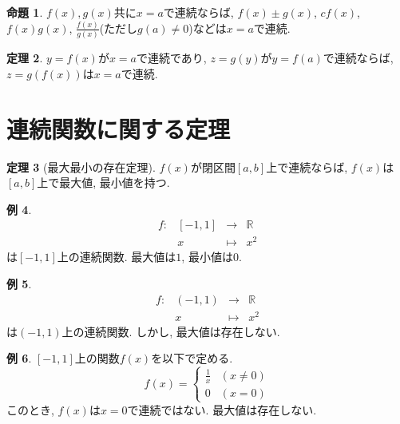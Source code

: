 \documentclass[dvipdfmx,a4paper,11pt]{article}
\newcommand{\R}{\mathbb{R}}
\theoremstyle{definition}
\newtheorem{thm}{定理}
\newtheorem{prop}[thm]{命題}
\newtheorem{exa}[thm]{例}
\begin{document}
 
  \begin{tcolorbox}[
    colback = white,
    colframe = green!35!black,
    fonttitle = \bfseries,
    breakable = true]
    \begin{prop}
  $f(x), g(x)$共に$x=a$で連続ならば, $f(x) \pm g(x)$, $c f(x)$,  $f(x)g(x)$, $\frac{f(x)}{g(x)} $(ただし$g(a) \neq 0$)などは$x=a$で連続.
 \end{prop}
   \end{tcolorbox}

  \begin{tcolorbox}[
    colback = white,
    colframe = green!35!black,
    fonttitle = \bfseries,
    breakable = true]
    \begin{thm}
  $y=f(x)$が$x=a$で連続であり, $z=g(y)$が$y=f(a)$で連続ならば, 
  $z=g(f(x))$は$x=a$で連続.
 \end{thm}
   \end{tcolorbox}
 
 \section{連続関数に関する定理}
 
   \begin{tcolorbox}[
    colback = white,
    colframe = green!35!black,
    fonttitle = \bfseries,
    breakable = true]
    \begin{thm}[最大最小の存在定理]
$f(x)$が閉区間$[a,b]$上で連続ならば, $f(x)$は$[a,b]$上で最大値, 最小値を持つ.
 \end{thm}
   \end{tcolorbox}
 
 \begin{exa}
     $$
\begin{array}{cccc}
f: &[-1,1]& \rightarrow & \R  \\
&x& \longmapsto & x^2
\end{array}
$$
は$[-1,1]$上の連続関数. 
最大値は$1$, 最小値は$0$.
\end{exa}
 \begin{exa}
     $$
\begin{array}{cccc}
f: &(-1,1)& \rightarrow & \R  \\
&x& \longmapsto & x^2
\end{array}
$$
は$(-1,1)$上の連続関数. 
しかし, 最大値は存在しない.
\end{exa}

   \begin{exa}
   $[-1,1]$上の関数$f(x)$を以下で定める.
   $$
  f(x)= \begin{cases}
    \frac{1}{x}& (x \neq 0) \\
    0& (x= 0)
  \end{cases}
  $$
  このとき, $f(x)$は$x=0$で連続ではない.
  最大値は存在しない.
   \end{exa}
 
\end{document}
